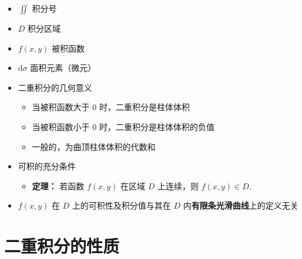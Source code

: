 \documentclass[lang = zh , final , oneside , openany , titlepage , zihao = -4 , linespread = 1.3 , baselineskip = false , cjk-font = windows , text-font = newtx , math-font = newtx]{sjtureport}
\begin{document}
\begin{itemize}
\item
  \(\displaystyle \iint\) 积分号
\item
  \(D\) 积分区域
\item
  \(f(x,y)\) 被积函数
\item
  \(\mathrm{d}\sigma\) 面积元素（微元）
\item
  二重积分的几何意义

  \begin{itemize}
  \item
    当被积函数大于 \(0\) 时，二重积分是柱体体积
  \item
    当被积函数小于 \(0\) 时，二重积分是柱体体积的负值
  \item
    一般的，为曲顶柱体体积的代数和
  \end{itemize}
\item
  可积的充分条件

  \begin{itemize}
  \item
    \textbf{定理：} 若函数 \(f(x,y)\) 在区域 \(D\) 上连续，则
    \(f(x,y)\in D\).
  \end{itemize}
\item
  \(f(x,y)\) 在 \(D\) 上的可积性及积分值与其在 \(D\)
  内\textbf{有限条光滑曲线}上的定义无关
\end{itemize}

\section{二重积分的性质}
\end{document}
